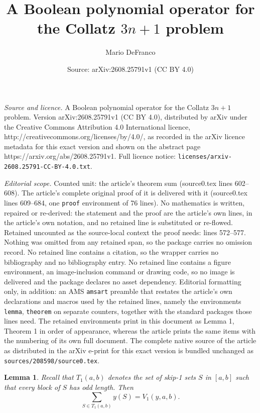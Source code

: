 \documentclass[10pt,a4paper]{amsart}
\title{A Boolean polynomial operator for the Collatz $3n+1$ problem}
\author{Mario DeFranco}
\date{Source: arXiv:2608.25791v1 (CC BY 4.0)}
\newtheorem{lemma}{Lemma}
\begin{document}
\maketitle

\noindent\emph{Source and licence.} A Boolean polynomial operator for the Collatz $3n+1$ problem. Version arXiv:2608.25791v1 (CC BY 4.0), distributed by arXiv under the Creative Commons Attribution 4.0 International licence, http://creativecommons.org/licenses/by/4.0/, as recorded in the arXiv licence metadata for this exact version and shown on the abstract page https://arxiv.org/abs/2608.25791v1. Full licence notice: \texttt{licenses/arxiv-2608.25791-CC-BY-4.0.txt}.\par\smallskip

\noindent\textit{Editorial scope.} Counted unit: the article's theorem sum (source0.tex lines 602--608). The article's complete original proof of it is delivered with it (source0.tex lines 609--684, one \texttt{proof} environment of 76 lines). No mathematics is written, repaired or re-derived: the statement and the proof are the article's own lines, in the article's own notation, and no retained line is substituted or re-flowed.  Retained uncounted as the source-local context the proof needs: lines 572--577.  Nothing was omitted from any retained span, so the package carries no omission record.  No retained line contains a citation, so the wrapper carries no bibliography and no bibliography entry.  No retained line contains a figure environment, an image-inclusion command or drawing code, so no image is delivered and the package declares no asset dependency.  Editorial formatting only, in addition: an AMS \texttt{amsart} preamble that restates the article's own declarations and macros used by the retained lines, namely the environments \texttt{lemma}, \texttt{theorem} on separate counters, together with the standard packages those lines need.  The retained environments print in this document as Lemma 1, Theorem 1 in order of appearance, whereas the article prints the same items with the numbering of its own full document.  The complete native source of the article as distributed in the arXiv e-print for this exact version is bundled unchanged as \texttt{sources/208598/source0.tex}.
\begin{lemma} \label{l V}
Recall that $T_1(a,b)$ denotes the set of skip-1 sets $S$ in $[a,b]$ such that every block of $S$ has odd length.   Then 
\[
\sum_{S \in T_1(a,b)} y(S) =  V_1(y,a,b). 
\]
\end{lemma}
\end{document}
